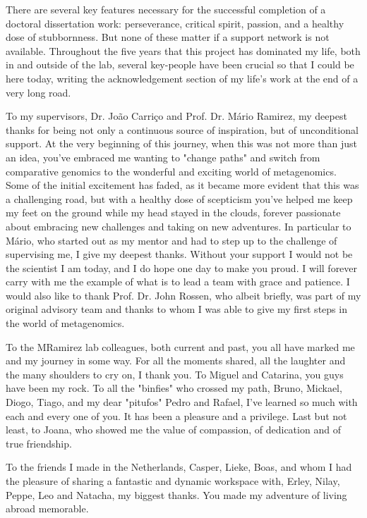 There are several key features necessary for the successful completion of a doctoral dissertation work: perseverance, critical spirit, passion, and a healthy dose of stubbornness. But none of these matter if a support network is not available. Throughout the five years that this project has dominated my life, both in and outside of the lab, several key-people have been crucial so that I could be here today, writing the acknowledgement section of my life's work at the end of a very long road. 

To my supervisors, Dr. João Carriço and Prof. Dr. Mário Ramirez, my deepest thanks for being not only a continuous source of inspiration, but of unconditional support. At the very beginning of this journey, when this was not more than just an idea, you've embraced me wanting to "change paths" and switch from comparative genomics to the wonderful and exciting world of metagenomics. Some of the initial excitement has faded, as it became more evident that this was a challenging road, but with a healthy dose of scepticism you've helped me keep my feet on the ground while my head stayed in the clouds, forever passionate about embracing new challenges and taking on new adventures. In particular to Mário, who started out as my mentor and had to step up to the challenge of supervising me, I give my deepest thanks. Without your support I would not be the scientist I am today, and I do hope one day to make you proud. I will forever carry with me the example of what is to lead a team with grace and patience. I would also like to thank Prof. Dr. John Rossen, who albeit briefly, was part of my original advisory team and thanks to whom I was able to give my first steps in the world of metagenomics. 

To the MRamirez lab colleagues, both current and past, you all have marked me and my journey in some way. For all the moments shared, all the laughter and the many shoulders to cry on, I thank you. To Miguel and Catarina, you guys have been my rock. To all the "binfies" who crossed my path, Bruno, Mickael, Diogo, Tiago, and my dear "pitufos" Pedro and Rafael, I've learned so much with each and every one of you. It has been a pleasure and a privilege. Last but not least, to Joana, who showed me the value of compassion, of dedication and of true friendship.

To the friends I made in the Netherlands, Casper, Lieke, Boas, and whom I had the pleasure of sharing a fantastic and dynamic workspace with, Erley, Nilay, Peppe, Leo and Natacha, my biggest thanks. You made my adventure of living abroad memorable.

